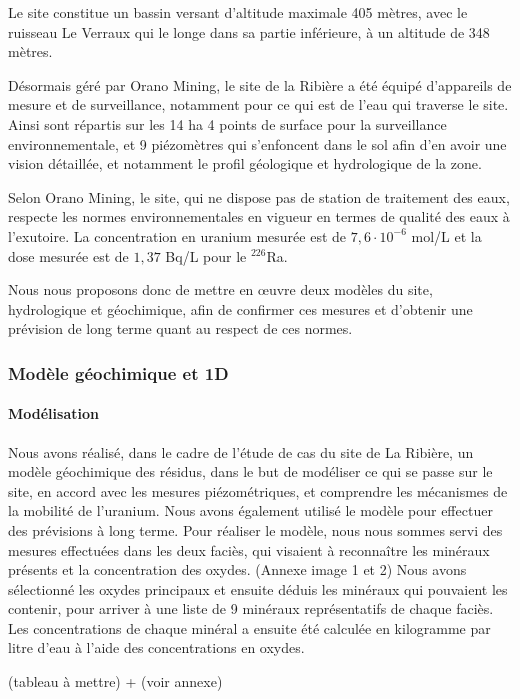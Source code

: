 \documentclass{article}
\begin{document}
Le site constitue un bassin versant d’altitude maximale 405 mètres, avec le ruisseau Le Verraux qui le longe dans sa partie inférieure, à un altitude de 348 mètres.

Désormais géré par Orano Mining, le site de la Ribière a été équipé d'appareils de mesure et de surveillance, notamment pour ce qui est de l’eau qui traverse le site. Ainsi sont répartis sur les 14 ha 4 points de surface pour la surveillance environnementale, et 9 piézomètres qui s’enfoncent dans le sol afin d’en avoir une vision détaillée, et notamment le profil géologique et hydrologique de la zone.

Selon Orano Mining, le site, qui ne dispose pas de station de traitement des eaux, respecte les normes environnementales en vigueur en termes de qualité des eaux à l’exutoire. La concentration en uranium mesurée est de $7,6 \cdot 10^{-6} $ mol/L et la dose mesurée est de $1,37$ Bq/L pour le $^{226}$Ra.

Nous nous proposons donc de mettre en œuvre deux modèles du site, hydrologique et géochimique, afin de confirmer ces mesures et d’obtenir une prévision de long terme quant au respect de ces normes. 

\subsubsection{Modèle géochimique et 1D}
\paragraph{Modélisation}

Nous avons réalisé, dans le cadre de l’étude de cas du site de La Ribière, un modèle géochimique des résidus, dans le but de modéliser ce qui se passe sur le site, en accord avec les mesures piézométriques, et comprendre les mécanismes de la mobilité de l’uranium. Nous avons également utilisé le modèle pour effectuer des prévisions à long terme.
Pour réaliser le modèle, nous nous sommes servi des mesures effectuées dans les deux faciès, qui visaient à reconnaître les minéraux présents et la concentration des oxydes. (Annexe image 1 et 2) Nous avons sélectionné les oxydes principaux et ensuite déduis les minéraux qui pouvaient les contenir, pour arriver à une liste de 9 minéraux représentatifs de chaque faciès. Les concentrations de chaque minéral a ensuite été calculée en kilogramme par litre d’eau à l’aide des concentrations en oxydes. 
	
	(tableau à mettre) + (voir annexe)
	
\end{document}
